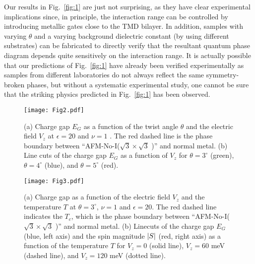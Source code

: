 \documentclass[aps,prb,twocolumn,superscriptaddress,longbibliography]{revtex4-2}
\begin{document}
Our results in Fig.~\ref{fig:1} are just not surprising, as they have clear experimental implications since, in principle, the interaction range can be controlled by introducing metallic gates close to the TMD bilayer.  In addition, samples with varying $\theta$ and a varying background dielectric constant (by using different substrates) can be fabricated to directly verify that the resultant quantum phase diagram depends quite sensitively on the interaction range.  It is actually possible that our predictions of Fig.~\ref{fig:1} have already been verified experimentally as samples from different laboratories do not always reflect the same symmetry-broken phases, but without a systematic experimental study, one cannot be sure that the striking physics predicted in Fig.~\ref{fig:1} has been observed.

\begin{figure}[ht]
    \centering
    \texttt{[image: Fig2.pdf]}
    \caption{(a) Charge gap $E_G$ as a function of the twist angle $\theta$ and the electric field $V_z$ at $\epsilon=20$ and $\nu=1$ . The red dashed line is the phase boundary between ``AFM-No-I($\sqrt{3}\times\sqrt{3}$ )'' and normal metal. (b) Line cuts of the charge gap $E_G$ as a function of $V_z$ for $\theta=3^\circ$ (green), $\theta=4^\circ$ (blue), and $\theta=5^\circ$ (red).}
    \label{fig:2}
\end{figure}

\begin{figure}[ht]
    \centering
    \texttt{[image: Fig3.pdf]}
    \caption{(a) Charge gap as a function of the electric field $V_z$ and the temperature $T$ at $\theta=3^\circ$, $\nu=1$ and $\epsilon=20$. The red dashed line indicates the $T_c$, which is the phase boundary between ``AFM-No-I($\sqrt{3}\times\sqrt{3}$ )'' and normal metal. (b) Linecuts of the charge gap $E_G$ (blue, left axis) and the spin magnitude $\abs{S}$ (red, right axis) as a function of the temperature $T$ for $V_z=0$ (solid line), $V_z=60$ meV (dashed line), and $V_z=120$ meV (dotted line). }
    \label{fig:3}
\end{figure}
\end{document}

